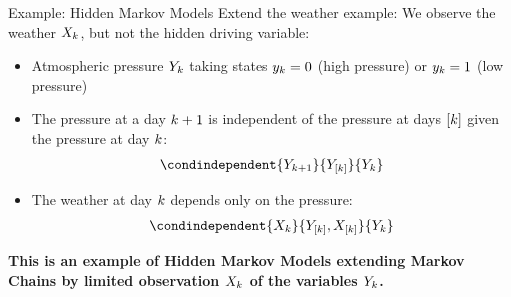 \documentclass{beamer}
\begin{document}
    \begin{frame}{Example: Hidden Markov Models}
        Extend the weather example: We observe the weather $X_{k}$, but not the hidden driving variable:
        \begin{itemize}
            \item Atmospheric pressure $Y_{k}$ taking states $y_{k}=0$ (high pressure) or $y_{k}=1$ (low pressure)
            \item The pressure at a day $k+1$ is independent of the pressure at days $[k]$ given the pressure at day $k$:
            \begin{align*}
                \condindependent{\headvariableof{\catenumerator+1}}{\headvariableof{[\catenumerator]}}{\headvariableof{\catenumerator}}
            \end{align*}
            \item The weather at day $k$ depends only on the pressure:
            \begin{align*}
                \condindependent{\catvariableof{\catenumerator}}{\headvariableof{[\catenumerator]},\catvariableof{[\catenumerator]}}{\headvariableof{\catenumerator}}
            \end{align*}
        \end{itemize}
        \par \medskip
        \begin{center}
            \bf
            This is an example of Hidden Markov Models extending Markov Chains by limited observation $X_{k}$ of the variables $Y_{k}$.

        \end{center}
    \end{frame}
\end{document}
